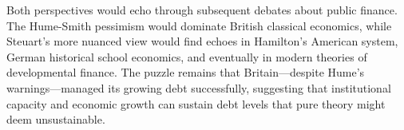 \documentclass[12pt]{article}
\begin{document}
Both perspectives would echo through subsequent debates about public finance. The Hume-Smith pessimism would dominate British classical economics, while Steuart's more nuanced view would find echoes in Hamilton's American system, German historical school economics, and eventually in modern theories of developmental finance. The puzzle remains that Britain—despite Hume's warnings—managed its growing debt successfully, suggesting that institutional capacity and economic growth can sustain debt levels that pure theory might deem unsustainable.



\end{document}
